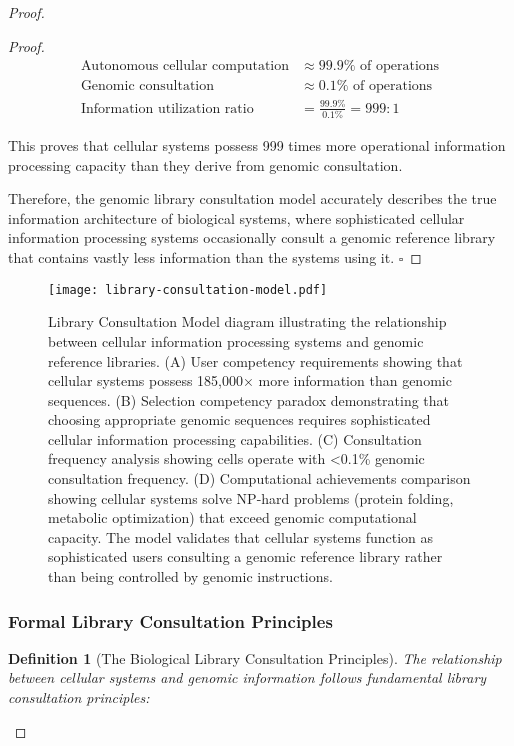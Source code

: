 \documentclass[12pt,a4paper]{article}
\newtheorem{definition}[theorem]{Definition}
\begin{document}
\begin{proof}
\begin{proof}
\begin{align}
\text{Autonomous cellular computation} &\approx 99.9\% \text{ of operations} \\
\text{Genomic consultation} &\approx 0.1\% \text{ of operations} \\
\text{Information utilization ratio} &= \frac{99.9\%}{0.1\%} = 999:1
\end{align}

This proves that cellular systems possess 999 times more operational information processing capacity than they derive from genomic consultation.

Therefore, the genomic library consultation model accurately describes the true information architecture of biological systems, where sophisticated cellular information processing systems occasionally consult a genomic reference library that contains vastly less information than the systems using it. $\square$
\end{proof}

\begin{figure}[H]
\centering
\texttt{[image: library-consultation-model.pdf]}
\caption{Library Consultation Model diagram illustrating the relationship between cellular information processing systems and genomic reference libraries. (A) User competency requirements showing that cellular systems possess 185,000× more information than genomic sequences. (B) Selection competency paradox demonstrating that choosing appropriate genomic sequences requires sophisticated cellular information processing capabilities. (C) Consultation frequency analysis showing cells operate with <0.1\% genomic consultation frequency. (D) Computational achievements comparison showing cellular systems solve NP-hard problems (protein folding, metabolic optimization) that exceed genomic computational capacity. The model validates that cellular systems function as sophisticated users consulting a genomic reference library rather than being controlled by genomic instructions.}
\label{fig:library-consultation-model}
\end{figure}

\subsubsection{Formal Library Consultation Principles}

\begin{definition}[The Biological Library Consultation Principles]
The relationship between cellular systems and genomic information follows fundamental library consultation principles:


\end{definition}
\end{proof}
\end{document}
